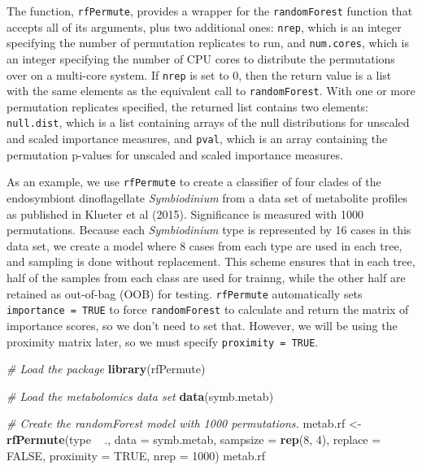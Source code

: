 \documentclass[]{article}
\newenvironment{Shaded}{\begin{snugshade}}{\end{snugshade}}
\newcommand{\KeywordTok}[1]{\textcolor[rgb]{0.13,0.29,0.53}{\textbf{{#1}}}}
\newcommand{\DataTypeTok}[1]{\textcolor[rgb]{0.13,0.29,0.53}{{#1}}}
\newcommand{\DecValTok}[1]{\textcolor[rgb]{0.00,0.00,0.81}{{#1}}}
\newcommand{\StringTok}[1]{\textcolor[rgb]{0.31,0.60,0.02}{{#1}}}
\newcommand{\CommentTok}[1]{\textcolor[rgb]{0.56,0.35,0.01}{\textit{{#1}}}}
\newcommand{\OtherTok}[1]{\textcolor[rgb]{0.56,0.35,0.01}{{#1}}}
\newcommand{\NormalTok}[1]{{#1}}
\begin{document}
The function, \texttt{rfPermute}, provides a wrapper for the
\texttt{randomForest} function that accepts all of its arguments, plus
two additional ones: \texttt{nrep}, which is an integer specifying the
number of permutation replicates to run, and \texttt{num.cores}, which
is an integer specifying the number of CPU cores to distribute the
permutations over on a multi-core system. If \texttt{nrep} is set to 0,
then the return value is a list with the same elements as the equivalent
call to \texttt{randomForest}. With one or more permutation replicates
specified, the returned list contains two elements: \texttt{null.dist},
which is a list containing arrays of the null distributions for unscaled
and scaled importance measures, and \texttt{pval}, which is an array
containing the permutation p-values for unscaled and scaled importance
measures.

As an example, we use \texttt{rfPermute} to create a classifier of four
clades of the endosymbiont dinoflagellate \emph{Symbiodinium} from a
data set of metabolite profiles as published in Klueter et al (2015).
Significance is measured with 1000 permutations. Because each
\emph{Symbiodinium} type is represented by 16 cases in this data set, we
create a model where 8 cases from each type are used in each tree, and
sampling is done without replacement. This scheme ensures that in each
tree, half of the samples from each class are used for trainng, while
the other half are retained as out-of-bag (OOB) for testing.
\texttt{rfPermute} automatically sets \texttt{importance\ =\ TRUE} to
force \texttt{randomForest} to calculate and return the matrix of
importance scores, so we don't need to set that. However, we will be
using the proximity matrix later, so we must specify
\texttt{proximity\ =\ TRUE}.

\begin{Shaded}
\begin{Highlighting}[]
\CommentTok{# Load the package}
\KeywordTok{library}\NormalTok{(rfPermute)}
\end{Highlighting}
\end{Shaded}

\begin{Shaded}
\begin{Highlighting}[]
\CommentTok{# Load the metabolomics data set}
\KeywordTok{data}\NormalTok{(symb.metab)}

\CommentTok{# Create the randomForest model with 1000 permutations.}
\NormalTok{metab.rf <-}\StringTok{ }\KeywordTok{rfPermute}\NormalTok{(type ~}\StringTok{ }\NormalTok{., }\DataTypeTok{data =} \NormalTok{symb.metab, }\DataTypeTok{sampsize =} \KeywordTok{rep}\NormalTok{(}\DecValTok{8}\NormalTok{, }\DecValTok{4}\NormalTok{), }\DataTypeTok{replace =} \OtherTok{FALSE}\NormalTok{, }
    \DataTypeTok{proximity =} \OtherTok{TRUE}\NormalTok{, }\DataTypeTok{nrep =} \DecValTok{1000}\NormalTok{)}
\NormalTok{metab.rf}
\end{Highlighting}
\end{Shaded}
\end{document}
